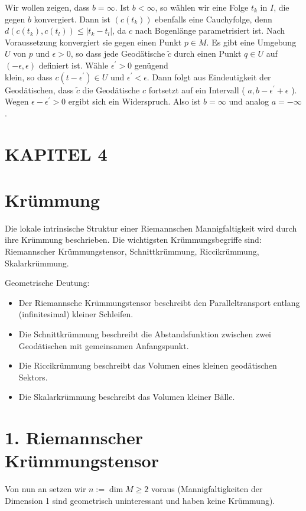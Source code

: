 \documentclass[10pt, letterpaper]{article}
\begin{document}
Wir wollen zeigen, dass $b=\infty$. Ist $b<\infty$, so wählen wir eine Folge $t_{k}$ in $I$, die gegen $b$ konvergiert. Dann ist $\left(c\left(t_{k}\right)\right)$ ebenfalls eine Cauchyfolge, denn $d\left(c\left(t_{k}\right), c\left(t_{l}\right)\right) \leq\left|t_{k}-t_{l}\right|$, da $c$ nach Bogenlänge parametrisiert ist. Nach Voraussetzung konvergiert sie gegen einen Punkt $p \in M$. Es gibt eine Umgebung $U$ von $p$ und $\epsilon>0$, so dass jede Geodätische $\tilde{c}$ durch einen Punkt $q \in U$ auf $(-\epsilon, \epsilon)$ definiert ist. Wähle $\epsilon^{\prime}>0$ genügend\\
klein, so dass $c\left(t-\epsilon^{\prime}\right) \in U$ und $\epsilon^{\prime}<\epsilon$. Dann folgt aus Eindeutigkeit der Geodätischen, dass $\tilde{c}$ die Geodätische $c$ fortsetzt auf ein Intervall ( $a, b-\epsilon^{\prime}+\epsilon$ ). Wegen $\epsilon-\epsilon^{\prime}>0$ ergibt sich ein Widerspruch. Also ist $b=\infty$ und analog $a=-\infty$.

\section*{KAPITEL 4}
\section*{Krümmung}
Die lokale intrinsische Struktur einer Riemannschen Mannigfaltigkeit wird durch ihre Krümmung beschrieben. Die wichtigsten Krümmungsbegriffe sind: Riemannscher Krümmungstensor, Schnittkrümmung, Riccikrümmung, Skalarkrümmung.

Geometrische Deutung:

\begin{itemize}
  \item Der Riemannsche Krümmungstensor beschreibt den Paralleltransport entlang (infinitesimal) kleiner Schleifen.
  \item Die Schnittkrümmung beschreibt die Abstandsfunktion zwischen zwei Geodätischen mit gemeinsamen Anfangspunkt.
  \item Die Riccikrümmung beschreibt das Volumen eines kleinen geodätischen Sektors.
  \item Die Skalarkrümmung beschreibt das Volumen kleiner Bälle.
\end{itemize}

\section*{1. Riemannscher Krümmungstensor}
Von nun an setzen wir $n:=\operatorname{dim} M \geq 2$ voraus (Mannigfaltigkeiten der Dimension 1 sind geometrisch uninteressant und haben keine Krümmung).
\end{document}

